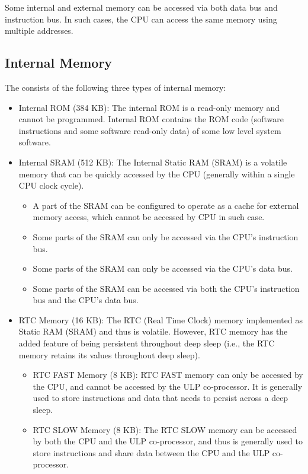 \documentclass[main\_\_EN.tex]{subfiles}
\begin{document}
Some internal and external memory can be accessed via both data bus and instruction bus. In such cases, the CPU can access the same memory using multiple addresses.

\subsection{Internal Memory}
\label{para:sysmem-embedded memory}

The \chipname{} consists of the following three types of internal memory:

\begin{itemize}
    \item Internal ROM (384 KB): The internal ROM is a read-only memory and cannot be programmed. Internal ROM contains the ROM code (software instructions and some software read-only data) of some low level system software.
    \item Internal SRAM (512 KB): The Internal Static RAM (SRAM) is a volatile memory that can be quickly accessed by the CPU (generally within a single CPU clock cycle).
    \begin{itemize}
        \item A part of the SRAM can be configured to operate as a cache for external memory access, which cannot be accessed by CPU in such case.
        \item Some parts of the SRAM can only be accessed via the CPU's instruction bus.
        \item Some parts of the SRAM can only be accessed via the CPU's data bus.
        \item Some parts of the SRAM can be accessed via both the CPU's instruction bus and the CPU's data bus.
    \end{itemize}
    \item RTC Memory (16 KB): The RTC (Real Time Clock) memory implemented as Static RAM (SRAM) and thus is volatile. However, RTC memory has the added feature of being persistent throughout deep sleep (i.e., the RTC memory retains its values throughout deep sleep).
    \begin{itemize}
        \item RTC FAST Memory (8 KB):
        RTC FAST memory can only be accessed by the CPU, and cannot be accessed by the ULP co-processor. It is generally used to store instructions and data that needs to persist across a deep sleep.
        \item RTC SLOW Memory (8 KB):
        The RTC SLOW memory can be accessed by both the CPU and the ULP co-processor, and thus is generally used to store instructions and share data between the CPU and the ULP co-processor.
    \end{itemize}
\end{itemize}
\end{document}
